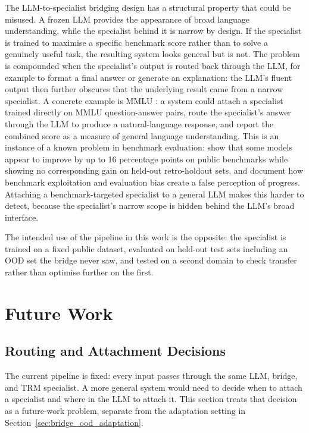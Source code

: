 \documentclass[11pt]{article}
\begin{document}
The LLM-to-specialist bridging design has a structural property that could be misused.
A frozen LLM provides the appearance of broad language understanding, while the specialist behind it is narrow by design.
If the specialist is trained to maximise a specific benchmark score rather than to solve a genuinely useful task, the resulting system looks general but is not.
The problem is compounded when the specialist's output is routed back through the LLM, for example to format a final answer or generate an explanation: the LLM's fluent output then further obscures that the underlying result came from a narrow specialist.
A concrete example is MMLU \cite{hendrycksMeasuringMassiveMultitask2021}: a system could attach a specialist trained directly on MMLU question-answer pairs, route the specialist's answer through the LLM to produce a natural-language response, and report the combined score as a measure of general language understanding.
This is an instance of a known problem in benchmark evaluation: \citet{haimesBenchmarkInflationRevealing2024} show that some models appear to improve by up to 16 percentage points on public benchmarks while showing no corresponding gain on held-out retro-holdout sets, and \citet{banerjeeVulnerabilityLanguageModel2024} document how benchmark exploitation and evaluation bias create a false perception of progress.
Attaching a benchmark-targeted specialist to a general LLM makes this harder to detect, because the specialist's narrow scope is hidden behind the LLM's broad interface.

The intended use of the pipeline in this work is the opposite: the specialist is trained on a fixed public dataset, evaluated on held-out test sets including an OOD set the bridge never saw, and tested on a second domain to check transfer rather than optimise further on the first.
\section{Future Work}
\label{sec:future_work}

\subsection{Routing and Attachment Decisions}
\label{sec:routing_future_work}

The current pipeline is fixed: every input passes through the same LLM, bridge, and TRM specialist.
A more general system would need to decide when to attach a specialist and where in the LLM to attach it.
This section treats that decision as a future-work problem, separate from the adaptation setting in Section~\ref{sec:bridge_ood_adaptation}.
\end{document}
